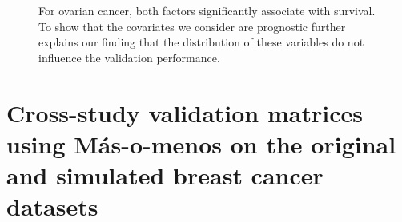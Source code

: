 \documentclass{article}
\begin{document}
\begin{figure}[H]
{    For ovarian cancer, both factors significantly associate with survival. To show that the covariates we consider are prognostic further explains our finding that the distribution of these variables do not influence the validation performance.}
    \label{forest-plots-ovarian}
  \end{figure}

\newpage
\section{Cross-study validation matrices using M\'{a}s-o-menos on the original and simulated breast cancer datasets}
\end{document}
